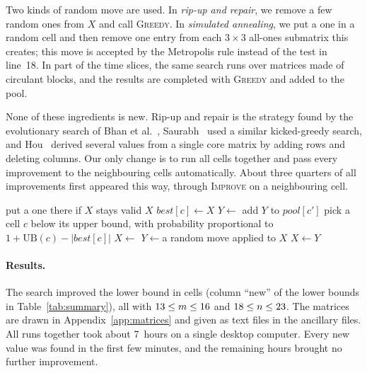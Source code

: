\documentclass[11pt]{article}
\begin{document}
Two kinds of random move are used. In \emph{rip-up and repair}, we remove a
few random ones from $X$ and call \textsc{Greedy}. In \emph{simulated
annealing}, we put a one in a random cell and then remove one entry from
each $3\times3$ all-ones submatrix this creates; this move is accepted by
the Metropolis rule instead of the test in line~18. In part of the time
slices, the same search runs over matrices made of circulant blocks, and
the results are completed with \textsc{Greedy} and added to the pool.

None of these ingredients is new. Rip-up and repair is the strategy found
by the evolutionary search of Bhan et al.~\cite{BNRL26}, Saurabh~\cite{Sau26}
used a similar kicked-greedy search, and Hou~\cite{Hou26} derived several
values from a single core matrix by adding rows and deleting columns. Our
only change is to run all cells together and pass every improvement to the
neighbouring cells automatically. About three quarters of all improvements
first appeared this way, through \textsc{Improve} on a neighbouring cell.

\begin{algorithm}[t]
\caption{Joint local search over all cells}\label{alg:search}
\begin{algorithmic}[1]
    \State put a one there if $X$ stays valid
  \EndFor
  \State \Return $X$
\EndProcedure
\Statex
{} 
  \State $\mathit{best}[c]\gets X$
   
    \State $Y\gets{}$
      \State {}
    \Else
      \State add $Y$ to $\mathit{pool}[c']$
    \EndIf
  \EndFor
\EndProcedure
\Statex
{}
  \State pick a cell $c$ below its upper bound, with probability
    proportional to $1+\mathrm{UB}(c)-|\mathit{best}[c]|$
  \State $X\gets{}$
    \State $Y\gets{}$a random move applied to $X$
      \State $X\gets Y$
    \EndIf
      \State {}
    \EndIf
  \EndFor
\EndWhile
\end{algorithmic}
\end{algorithm}

\paragraph{Results.} The search improved the lower bound in
\NumImprovedWord{} cells (column ``new'' of the lower bounds in
Table~\ref{tab:summary}), all with $13\le m\le16$ and
$18\le n\le23$. The matrices are drawn in Appendix~\ref{app:matrices}
and given as text files in the ancillary files. All runs together took
about 7~hours on a single desktop computer. Every new value was found in
the first few minutes, and the remaining hours brought no further
improvement.
\end{document}
